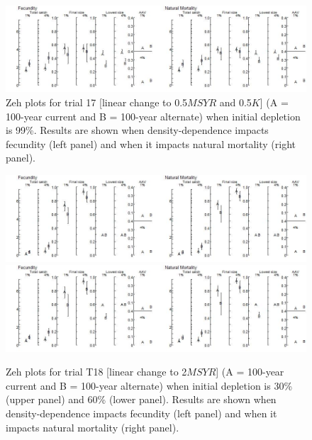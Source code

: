 \documentclass{article}\usepackage[]{graphicx}\usepackage[]{color}
\providecommand\phantomsection{}
\renewcommand{\thefigure}{\thesection(\alph{figure})}
\begin{document}
\begin{landscape}
\phantomsection
{}
\setcounter{figure}{0}


\begin{figure}[H]
\centering
\includegraphics[]{SC66aRMP10_Part2_T19-D.jpeg}
\caption{
Zeh plots for trial 17
[linear change to 0.5$MSYR$ and 0.5$K$]
(A = 100-year current and B = 100-year alternate)
when initial depletion is 99\%.
Results are shown when density-dependence impacts fecundity (left panel) and when it impacts natural mortality (right panel).
}
\end{figure}

\clearpage
\phantomsection
\renewcommand{\thefigure}{\thesection(\alph{figure})}
\setcounter{figure}{0}


\begin{figure}[H]
\centering
\includegraphics[]{SC66aRMP10_Part2_T18-R.jpeg}
\includegraphics[]{SC66aRMP10_Part2_T18-S.jpeg}
\caption{
Zeh plots for trial T18
[linear change to 2$MSYR$]
(A = 100-year current and B = 100-year alternate)
when initial depletion is 30\% (upper panel) and 60\% (lower panel).
Results are shown when density-dependence impacts fecundity (left panel) and when it impacts natural mortality (right panel).
}
\end{figure}




\end{landscape}
\end{document}
